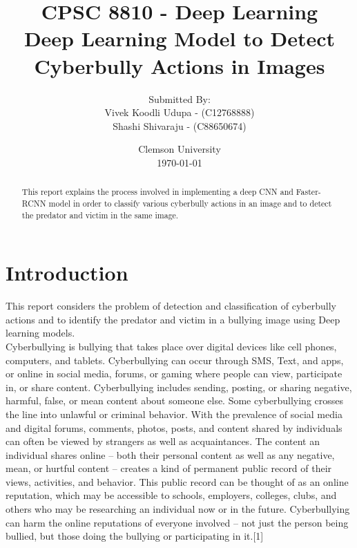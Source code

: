 \documentclass[12pt]{article}
\title{\bf CPSC 8810 - Deep Learning\\
Deep Learning Model to Detect Cyberbully Actions in Images}
\author{Submitted By:\\	Vivek Koodli Udupa - (C12768888) \\
		Shashi Shivaraju - (C88650674)\\}
\date{Clemson University \\\today}
\begin{document}
\sloppy %
\begin{titlingpage}
\maketitle
{}%
\end{titlingpage}



\newpage
\begin{abstract}
\thispagestyle{plain}
This report explains the process involved in implementing a deep CNN and Faster-RCNN model in order to classify various cyberbully actions in an image and to detect the predator and victim in the same image. 
\end{abstract}
\newpage

\section{Introduction}
This report considers the problem of detection and classification of cyberbully actions and to identify the predator and victim in a bullying image using Deep learning models.  \\

Cyberbullying is bullying that takes place over digital devices like cell phones, computers, and tablets. Cyberbullying can occur through SMS, Text, and apps, or online in social media, forums, or gaming where people can view, participate in, or share content. Cyberbullying includes sending, posting, or sharing negative, harmful, false, or mean content about someone else. Some cyberbullying crosses the line into unlawful or criminal behavior. With the prevalence of social media and digital forums, comments, photos, posts, and content shared by individuals can often be viewed by strangers as well as acquaintances. The content an individual shares online – both their personal content as well as any negative, mean, or hurtful content – creates a kind of permanent public record of their views, activities, and behavior. This public record can be thought of as an online reputation, which may be accessible to schools, employers, colleges, clubs, and others who may be researching an individual now or in the future. Cyberbullying can harm the online reputations of everyone involved – not just the person being bullied, but those doing the bullying or participating in it.[1] \\ 
\end{document}
